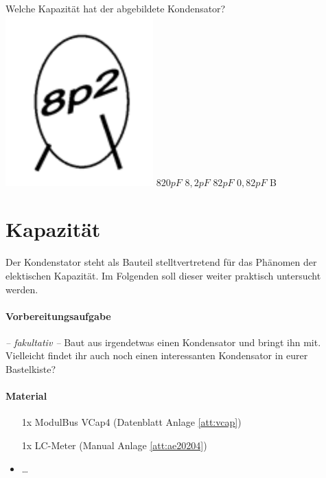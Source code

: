 {Welche Kapazität hat der abgebildete Kondensator?\\
\includegraphics[scale=0.9]{TC205.png}
}%
{$820pF$}%
{$8,2pF$}%
{$82pF$}%
{$0,82pF$}%
{B}%


\clearpage

\section{Kapazität}

Der Kondenstator steht als Bauteil stelltvertretend für das Phänomen der
elektischen Kapazität. Im Folgenden soll dieser weiter praktisch untersucht
werden.

\paragraph{Vorbereitungsaufgabe}

\emph{-- fakultativ --} Baut aus irgendetwas einen Kondensator und bringt ihn mit.
Vielleicht findet ihr auch noch einen interessanten Kondensator in eurer
Bastelkiste?


\paragraph{Material}

\begin{itemize}
  \item[1x] ModulBus VCap4 (Datenblatt Anlage \ref{att:vcap})
  \item[1x] LC-Meter (Manual Anlage \ref{att:ae20204})
  \item \dots
\end{itemize}

